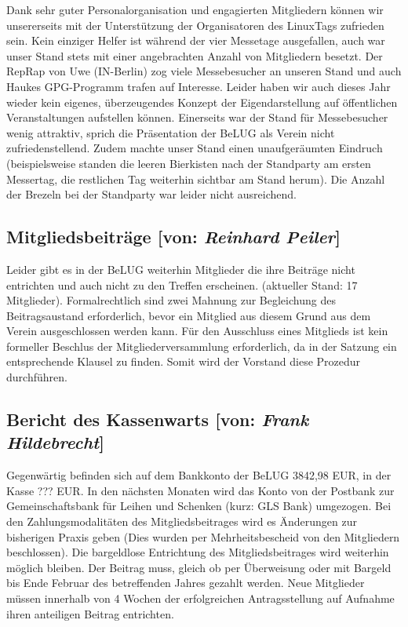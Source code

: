 \documentclass[11pt,a4paper,ngerman]{article}
\begin{document}
Dank sehr guter Personalorganisation und engagierten Mitgliedern können wir 
unsererseits mit der Unterstützung der Organisatoren des LinuxTags zufrieden 
sein. Kein einziger Helfer ist während der vier Messetage ausgefallen, auch war 
unser Stand stets mit einer angebrachten Anzahl von Mitgliedern besetzt. Der 
RepRap von Uwe (IN-Berlin) zog viele Messebesucher an unseren Stand und auch 
Haukes GPG-Programm trafen auf Interesse. Leider haben wir auch dieses Jahr 
wieder kein eigenes, überzeugendes Konzept der Eigendarstellung auf 
öffentlichen Veranstaltungen aufstellen können. Einerseits war der Stand für 
Messebesucher wenig attraktiv, sprich die Präsentation der BeLUG als Verein 
nicht zufriedenstellend. Zudem machte unser Stand einen unaufgeräumten Eindruch 
(beispielsweise standen die leeren Bierkisten nach der Standparty am ersten 
Messertag, die restlichen Tag weiterhin sichtbar am Stand herum). Die Anzahl 
der Brezeln bei der Standparty war leider nicht ausreichend.
  
  
  
  \subsection{Mitgliedsbeiträge [von: \textcolor{hellgrau.60}{\textsl{Reinhard 
              Peiler}}]}

Leider gibt es in der BeLUG weiterhin Mitglieder die ihre Beiträge nicht 
entrichten und auch nicht zu den Treffen erscheinen. (aktueller Stand: 17 
Mitglieder). Formalrechtlich sind zwei Mahnung zur Begleichung des 
Beitragsaustand erforderlich, bevor ein Mitglied aus diesem Grund aus dem 
Verein ausgeschlossen werden kann. Für den Ausschluss eines Mitglieds ist kein 
formeller Beschlus der Mitgliederversammlung erforderlich, da in der Satzung 
ein entsprechende Klausel zu finden. Somit wird der Vorstand diese Prozedur 
durchführen.


  \subsection{Bericht des Kassenwarts [von: 
\textcolor{hellgrau.60}{\textsl{Frank Hildebrecht}}]}

Gegenwärtig befinden sich auf dem Bankkonto der BeLUG 3842,98 EUR, in der Kasse 
??? EUR. In den nächsten Monaten wird das Konto von der Postbank zur 
Gemeinschaftsbank für Leihen und Schenken (kurz: GLS Bank) umgezogen. Bei den 
Zahlungsmodalitäten des Mitgliedsbeitrages wird es Änderungen zur 
bisherigen Praxis geben (Dies wurden per Mehrheitsbescheid von den Mitgliedern 
beschlossen). Die bargeldlose Entrichtung des Mitgliedsbeitrages wird weiterhin 
möglich bleiben. Der Beitrag muss, gleich ob per Überweisung oder mit Bargeld 
bis Ende Februar des betreffenden Jahres gezahlt werden. Neue Mitglieder müssen 
innerhalb von 4 Wochen der erfolgreichen Antragsstellung auf Aufnahme ihren 
anteiligen Beitrag entrichten.
\end{document}
